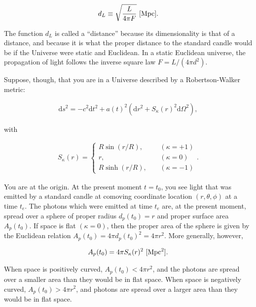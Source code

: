 \documentclass[a4paper,11pt]{article}
\begin{document}
\begin{align*}
    d_L \equiv \sqrt{\frac{L}{4\pi F}} ~ [{\rm Mpc}].
\end{align*}

{\noindent}The function $d_L$ is called a ``distance'' because its dimensionality is that of a distance, and because it is what the proper distance to the standard candle would be if the Universe were static and Euclidean. In a static Euclidean universe, the propagation of light follows the inverse square law $F = L/(4\pi d^2)$.

{\noindent}Suppose, though, that you are in a Universe described by a Robertson-Walker metric:

\begin{align*}
    \mathrm{d}s^2 = - c^2\mathrm{d}t^2 + a(t)^2(\mathrm{d}r^2 + S_\kappa(r)^2\mathrm{d}\Omega^2),
\end{align*}

{\noindent}with 

\begin{align*}
    S_\kappa(r) =
    \left\{
    \begin{aligned}
    R\sin(r/R), ~~~~~& (\kappa = +1) \\
              r,~~~~~& (\kappa = 0) \\
    R\sinh(r/R),~~~~~& (\kappa = -1)
    \end{aligned}
    \right.
    .
\end{align*}

{\noindent}You are at the origin. At the present moment $t = t_0$, you see light that was emitted by a standard candle at comoving coordinate location $(r,\theta,\phi)$ at a time $t_e$. The photons which were emitted at time $t_e$ are, at the present moment, spread over a sphere of proper radius $d_p(t_0) = r$ and proper surface area $A_p(t_0)$. If space is flat $(\kappa=0)$, then the proper area of the sphere is given by the Euclidean relation $A_p(t_0) = 4\pi d_p(t_0)^2 = 4\pi r^2$. More generally, however,

\begin{align*}
    A_p(t_0) = 4\pi S_\kappa(r)^2 ~ [{\rm Mpc^2}].
\end{align*}

{\noindent}When space is positively curved, $A_p(t_0) < 4\pi r^2$, and the photons are spread over a smaller area than they would be in flat space. When space is negatively curved, $A_p(t_0) > 4\pi r^2$, and photons are spread over a larger area than they would be in flat space.
\end{document}

